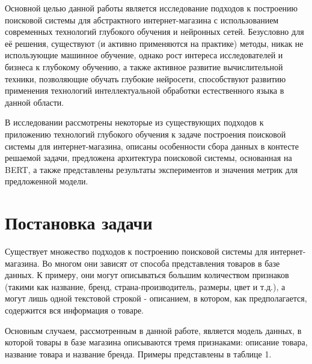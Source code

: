 \documentclass[12pt,a4paper]{article}
\begin{document}
Основной целью данной работы является исследование подходов к построению поисковой системы для абстрактного интернет-магазина с использованием современных технологий глубокого обучения и нейронных сетей. Безусловно для её решения, существуют (и активно применяются на практике) методы, никак не использующие машинное обучение, однако рост интереса исследователей и бизнеса к глубокому обучению, а также активное развитие вычислительной техники, позволяющие обучать глубокие нейросети, способствуют развитию применения технологий интеллектуальной обработки естественного языка в данной области.

В исследовании рассмотрены некоторые из существующих подходов к приложению технологий глубокого обучения к задаче построения поисковой системы для интернет-магазина, описаны особенности сбора данных в контесте решаемой задачи, предложена архитектура поисковой системы, основанная на BERT, а также представлены результаты экспериментов и значения метрик для предложенной модели. 

\section{Постановка задачи}

Существует множество подходов к построению поисковой системы для интернет-магазина. Во многом они зависят от способа представления товаров в базе данных. К примеру, они могут описываться большим количеством признаков (такими как название, бренд, страна-производитель, размеры, цвет и т.д.), а могут лишь одной текстовой строкой - описанием, в котором, как предполагается, содержится вся информация о товаре.

Основным случаем, рассмотренным в данной работе, является модель данных, в которой товары в базе магазина описываются тремя признаками: описание товара, название товара и название бренда. Примеры представлены в таблице 1.

\begin{table}[H]
\begin{center}
    \caption{Пример данных в базе интернет-магазина}
\end{center}
\end{table}
\end{document}
